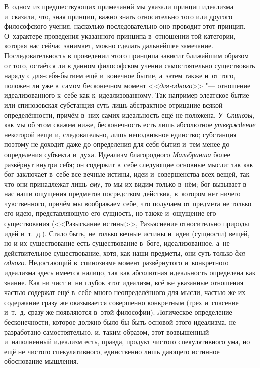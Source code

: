 В~одном из предшествующих примечаний мы указали принцип идеализма и~сказали,
что, зная принцип, важно знать относительно того или другого философского
учения, насколько последовательно оно проводит этот принцип. О~характере
проведения указанного принципа в~отношении той категории, которая нас
сейчас занимает, можно сделать дальнейшее замечание. Последовательность в
проведении этого принципа зависит ближайшим образом от того, остаётся ли в
данном философском учении самостоятельно существовать наряду с
для-себя-бытием ещё и~конечное бытие, а~затем также и~от того, положен ли
уже в~самом бесконечном момент <<{\em для-одного}>>
"--- отношение идеализованного к~себе как к~идеализованному. Так например
элеатское бытие или спинозовская субстанция суть лишь абстрактное отрицание
всякой определённости, причём в~них самих идеальность ещё не положена.
У~{\em Спинозы,} как мы об этом скажем ниже,
бесконечность есть лишь абсолютное {\em утверждение}
некоторой вещи и, следовательно, лишь неподвижное единство; субстанция
поэтому не доходит даже до определения для-себя-бытия и~тем менее до
определения субъекта и~духа. Идеализм благородного
{\em Мальбранша} более развёрнут внутри себя; он
содержит в~себе следующие основные мысли: так как бог заключает в~себе все
вечные истины, идеи и~совершенства всех вещей, так что они принадлежат лишь
{\em ему,} то мы их видим только в~нём; бог вызывает в
нас наши ощущения предметов посредством действия, в~котором нет ничего
чувственного, причём мы воображаем себе, что получаем от предмета не только
его идею, представляющую его сущность, но также и~ощущение его
существования (<<Разыскание истины>>, Разъяснение относительно природы идей
и~т.~д.). Стало быть, не только вечные истины и~идеи (сущности) вещей, но и
их существование есть существование в~боге, идеализованное, а~не
действительное существование, хотя, как наши предметы, они суть только
{\em для-одного}. Недостающий в~спинозизме момент
развёрнутого и~конкретного идеализма здесь имеется налицо, так как
абсолютная идеальность определена как знание. Как ни чист и~ни глубок этот
идеализм, всё же указанные отношения частью содержат ещё в~себе много
неопределённого для мысли, частью же их содержание сразу же оказывается
совершенно конкретным (грех и~спасение и~т.~д. сразу же появляются в~этой
философии). Логическое определение бесконечности, которое должно было бы
быть основой этого идеализма, не разработано самостоятельно, и, таким
образом, этот возвышенный и~наполненный идеализм есть, правда, продукт
чистого спекулятивного ума, но ещё не чистого спекулятивного, единственно
лишь дающего истинное обоснование мышления.

